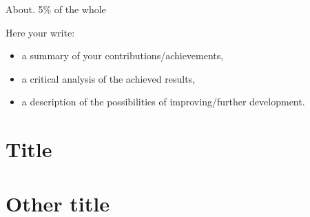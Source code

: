 \documentclass[12pt,a4paper,twoside]{report}
\begin{document}
About. 5\% of the whole

Here your write:
\begin{itemize}
\item a summary of your contributions/achievements,
\item a critical analysis of the achieved results,
\item a description of the possibilities of improving/further development.
\end{itemize}
\section{Title}
\section{Other title}


 


\end{document}
